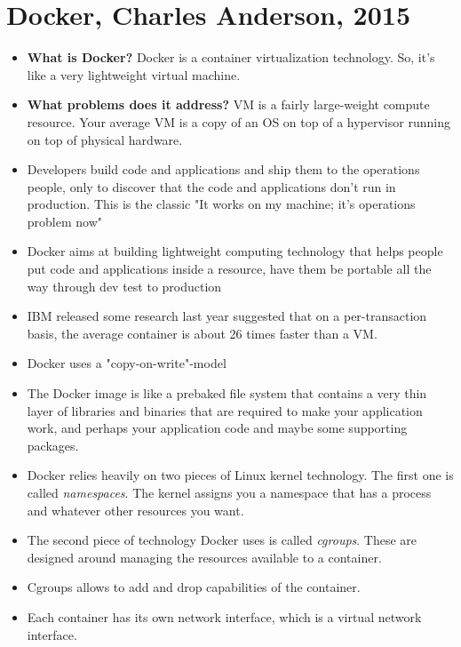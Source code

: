 \section{Docker, Charles Anderson, 2015}

\begin{itemize}
  \item \textbf{What is Docker?} Docker is a container virtualization technology. So, it's like a very lightweight virtual machine.
  \item \textbf{What problems does it address?} VM is a fairly large-weight compute resource. Your average VM is a copy of an OS on top of a hypervisor running on top of physical hardware.
  \item Developers build code and applications and ship them to the operations people, only to discover that the code and applications don't run in production. This is the classic "It works on my machine; it's operations problem now"
  \item Docker aims at building lightweight computing technology that helps people put code and applications inside a resource, have them be portable all the way through dev test to production
  \item IBM released some research last year suggested that on a per-transaction basis, the average container is about 26 times faster than a VM.
  \item Docker uses a "copy-on-write"-model
  \item The Docker image is like a prebaked file system that contains a very thin layer of libraries and binaries that are required to make your application work, and perhaps your application code and maybe some supporting packages.
  \item Docker relies heavily on two pieces of Linux kernel technology. The first one is called \textit{namespaces}. The kernel assigns you a namespace that has a process and whatever other resources you want.
  \item The second piece of technology Docker uses is called \textit{cgroups}. These are designed around managing the resources available to a container. 
  \item Cgroups allows to add and drop capabilities of the container.
  \item Each container has its own network interface, which is a virtual network interface.
\end{itemize}
